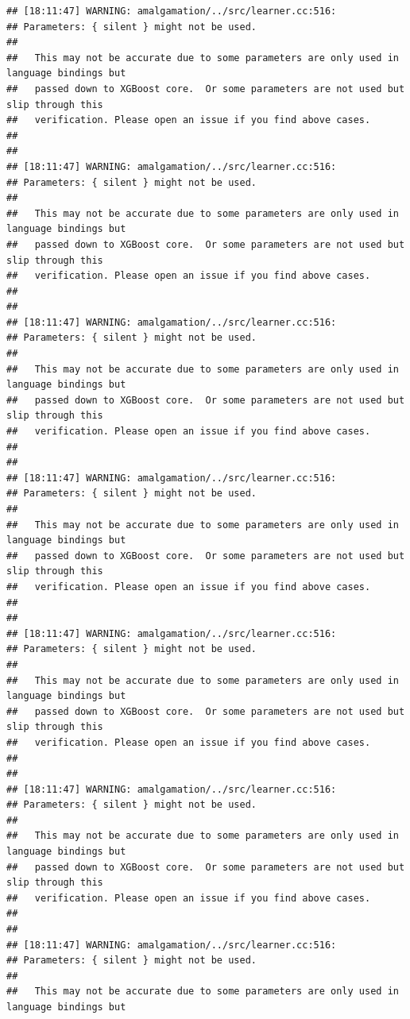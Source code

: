 \documentclass[AMS,STIX2COL]{WileyNJD-v2}\usepackage[]{graphicx}\usepackage[]{color}
\makeatletter
\newenvironment{kframe}{%
 \def\at@end@of@kframe{}%
 \ifinner\ifhmode%
  \def\at@end@of@kframe{\end{minipage}}%
  \begin{minipage}{\columnwidth}%
 \fi\fi%
 \def\FrameCommand##1{\hskip\@totalleftmargin \hskip-\fboxsep
 \colorbox{shadecolor}{##1}\hskip-\fboxsep
     \hskip-\linewidth \hskip-\@totalleftmargin \hskip\columnwidth}%
 \MakeFramed {\advance\hsize-\width
   \@totalleftmargin\z@ \linewidth\hsize
   \@setminipage}}%
 {\par\unskip\endMakeFramed%
 \at@end@of@kframe}
\newenvironment{knitrout}{}{} %
\makeatother
\begin{document}
\begin{knitrout}
\color{fgcolor}\begin{kframe}
\begin{verbatim}
## [18:11:47] WARNING: amalgamation/../src/learner.cc:516: 
## Parameters: { silent } might not be used.
## 
##   This may not be accurate due to some parameters are only used in language bindings but
##   passed down to XGBoost core.  Or some parameters are not used but slip through this
##   verification. Please open an issue if you find above cases.
## 
## 
## [18:11:47] WARNING: amalgamation/../src/learner.cc:516: 
## Parameters: { silent } might not be used.
## 
##   This may not be accurate due to some parameters are only used in language bindings but
##   passed down to XGBoost core.  Or some parameters are not used but slip through this
##   verification. Please open an issue if you find above cases.
## 
## 
## [18:11:47] WARNING: amalgamation/../src/learner.cc:516: 
## Parameters: { silent } might not be used.
## 
##   This may not be accurate due to some parameters are only used in language bindings but
##   passed down to XGBoost core.  Or some parameters are not used but slip through this
##   verification. Please open an issue if you find above cases.
## 
## 
## [18:11:47] WARNING: amalgamation/../src/learner.cc:516: 
## Parameters: { silent } might not be used.
## 
##   This may not be accurate due to some parameters are only used in language bindings but
##   passed down to XGBoost core.  Or some parameters are not used but slip through this
##   verification. Please open an issue if you find above cases.
## 
## 
## [18:11:47] WARNING: amalgamation/../src/learner.cc:516: 
## Parameters: { silent } might not be used.
## 
##   This may not be accurate due to some parameters are only used in language bindings but
##   passed down to XGBoost core.  Or some parameters are not used but slip through this
##   verification. Please open an issue if you find above cases.
## 
## 
## [18:11:47] WARNING: amalgamation/../src/learner.cc:516: 
## Parameters: { silent } might not be used.
## 
##   This may not be accurate due to some parameters are only used in language bindings but
##   passed down to XGBoost core.  Or some parameters are not used but slip through this
##   verification. Please open an issue if you find above cases.
## 
## 
## [18:11:47] WARNING: amalgamation/../src/learner.cc:516: 
## Parameters: { silent } might not be used.
## 
##   This may not be accurate due to some parameters are only used in language bindings but

\end{verbatim}
\end{kframe}
\end{knitrout}
\end{document}
